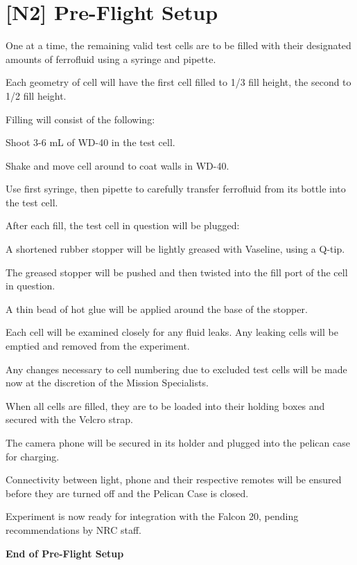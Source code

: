 \section{[N2] Pre-Flight Setup}
\begin{checklist}
	\item One at a time, the remaining valid test cells are to be filled with their designated amounts of ferrofluid using a syringe and pipette.
    \begin{checklist}
        \item Each geometry of cell will have the first cell filled to 1/3 fill height, the second to 1/2 fill height.
        \item Filling will consist of the following:
        \begin{checklist}
			\item Shoot 3-6 mL of WD-40 in the test cell.
			\item Shake and move cell around to coat walls in WD-40.
			\item Use first syringe, then pipette to carefully transfer ferrofluid from its bottle into the test cell.
        \end{checklist}
    \end{checklist}
	\item After each fill, the test cell in question will be plugged:
    \begin{checklist}
		\item A shortened rubber stopper will be lightly greased with Vaseline, using a Q-tip.
		\item The greased stopper will be pushed and then twisted into the fill port of the cell in question.
		\item A thin bead of hot glue will be applied around the base of the stopper.
    \end{checklist}
	\item Each cell will be examined closely for any fluid leaks. Any leaking cells will be emptied and removed from the experiment.
	\item Any changes necessary to cell numbering due to excluded test cells will be made now at the discretion of the Mission Specialists.
	\item When all cells are filled, they are to be loaded into their holding boxes and secured with the Velcro strap.
	\item The camera phone will be secured in its holder and plugged into the pelican case for charging.
	\item Connectivity between light, phone and their respective remotes will be ensured before they are turned off and the Pelican Case is closed.
	\item Experiment is now ready for integration with the Falcon 20, pending recommendations by NRC staff.
\end{checklist}
\textbf{End of Pre-Flight Setup}

